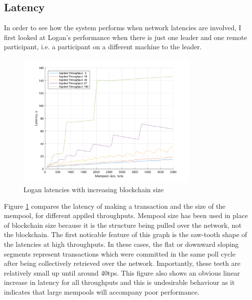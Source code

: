 \documentclass[12pt,a4paper,twoside,openright]{report}
\begin{document}
	\subsection{Latency}
	In order to see how the system performs when network latencies are involved, I first looked at Logan's performance when there is just one leader and one remote participant, i.e. a participant on a different machine to the leader.
	\begin{figure}
		\centering
		\includegraphics[width=0.8\textwidth]{figs/latencies_sizes_throughputs.png}
		\caption{Logan latencies with increasing blockchain size}
		\label{figs:remlatencysize}
	\end{figure}
	Figure \ref{figs:remlatencysize} compares the latency of making a transaction and the size of the mempool, for different appiled throughputs.
	Mempool size has been used in place of blockchain size because it is the structure being pulled over the network, not the blockchain.
	The first noticable feature of this graph is the saw-tooth shape of the latencies at high throughputs.
	In these cases, the flat or downward sloping segments represent transactions which were committed in the same poll cycle after being collectively retrieved over the network.
	Importantly, these teeth are relatively small up until around 40tps.
	This figure also shows an obvious linear increase in latency for all throughputs and this is undesirable behaviour as it indicates that large mempools will accompany poor performance. \\
	
\end{document}
